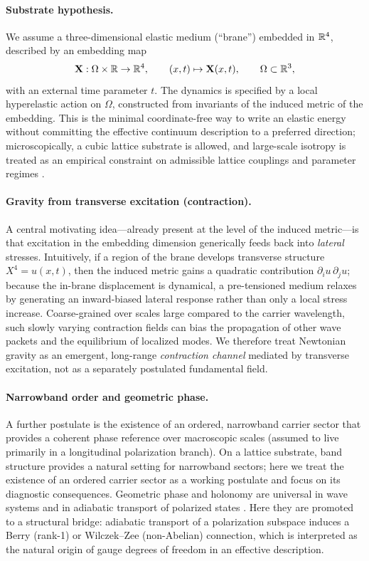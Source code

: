 \paragraph{Substrate hypothesis.}
We assume a three-dimensional elastic medium (``brane'') embedded in $\mathbb{R}^4$, described by an embedding map
\begin{equation}
  \mathbf{X}:\Omega\times\mathbb{R} \to \mathbb{R}^4, \qquad (x,t)\mapsto \mathbf{X}(x,t), \qquad \Omega\subset\mathbb{R}^3,
  \label{eq:embedding-map}
\end{equation}
with an external time parameter $t$.
The dynamics is specified by a local hyperelastic action on $\Omega$, constructed from invariants of the
induced metric of the embedding. This is the minimal coordinate-free way to write an elastic energy without
committing the effective continuum description to a preferred direction; microscopically, a cubic lattice
substrate is allowed, and large-scale isotropy is treated as an empirical constraint on admissible lattice
couplings and parameter regimes \citep{Ogden1984,Holzapfel2000,DoCarmo1992}.

\paragraph{Gravity from transverse excitation (contraction).}
A central motivating idea---already present at the level of the induced metric---is that excitation in the
embedding dimension generically feeds back into \emph{lateral} stresses. Intuitively, if a region of the brane
develops transverse structure $X^4=u(x,t)$, then the induced metric gains a quadratic contribution
$\partial_i u\,\partial_j u$; because the in-brane displacement is dynamical, a pre-tensioned medium relaxes by
generating an inward-biased lateral response rather than only a local stress increase. Coarse-grained over scales large compared to the carrier wavelength, such
slowly varying contraction fields can bias the propagation of other wave packets and the equilibrium of
localized modes. We therefore treat Newtonian gravity as an emergent, long-range \emph{contraction channel}
mediated by transverse excitation, not as a separately postulated fundamental field.

\paragraph{Narrowband order and geometric phase.}
A further postulate is the existence of an ordered, narrowband carrier sector that provides
a coherent phase reference over macroscopic scales (assumed to live primarily in a longitudinal
polarization branch).
On a lattice substrate, band structure provides a natural setting for narrowband sectors; here we treat the
existence of an ordered carrier sector as a working postulate and focus on its diagnostic consequences.
Geometric phase and holonomy are universal in wave systems and in adiabatic transport of polarized states
\citep{Pancharatnam1956,Berry1984,WilczekZee1984,Bliokh2015SpinOrbit,Cisowski2022}.
Here they are promoted to a structural bridge: adiabatic transport of a polarization subspace induces a
Berry (rank-1) or Wilczek--Zee (non-Abelian) connection, which is interpreted as the natural origin of
gauge degrees of freedom in an effective description.

